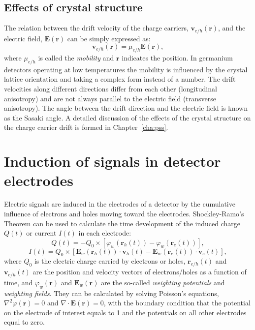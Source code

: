 \subsection{Effects of crystal structure}
\label{sec:det:struc}
The relation between the drift velocity of the charge carriers,
$\mathbf{v}_{e/h}(\mathbf{r})$, and the electric field,
$\mathbf{E}(\mathbf{r})$ can be simply expressed as:
\begin{equation} 
\label{eq:det:dv}
\mathbf{v}_{e/h} (\mathbf{r})= \mu_{e/h} \mathbf{E}(\mathbf{r}),
\end{equation}
where $\mu_{e/h}$ is called the \emph{mobility} and $\mathbf{r}$
indicates the position. In germanium detectors operating at low
temperatures the mobility is influenced by the crystal lattice
orientation and taking a complex form instead of a number. The drift
velocities along different directions differ from each other
(longitudinal anisotropy) and are not always parallel to the electric
field (transverse anisotropy). The angle between the drift direction
and the electric field is known as the Sasaki angle\cite{Sas56}. A
detailed discussion of the effects of the crystal structure on the
charge carrier drift is formed in Chapter~\ref{cha:pss}.

\section{Induction of signals in detector electrodes}
\label{sec:det:ramo}
Electric signals are induced in the electrodes of a detector by the
cumulative influence of electrons and holes moving toward the
electrodes. Shockley-Ramo's Theorem \cite{Gat82, Rad88, He00} can be
used to calculate the time development of the induced charge $Q(t)$ or
current $I(t)$ in each electrode:
\begin{equation} 
\label{eq:det:ramoq}
Q(t) = -Q_{0} \times [\varphi_{w}(\mathbf{r}_{h}(t)) -
\varphi_{w}(\mathbf{r}_{e}(t))],
\end{equation}
\begin{equation} 
\label{eq:det:ramoi}
I(t) = Q_{0} \times [\mathbf{E}_{w}(\mathbf{r}_{h}(t)) \cdot 
\mathbf{v}_{h}(t) - \mathbf{E}_{w}(\mathbf{r}_{e}(t)) \cdot 
\mathbf{v}_{e}(t)],
\end{equation}
where $Q_{0}$ is the electric charge carried by electrons or holes,
$\mathbf{r}_{e/h}(t)$ and $\mathbf{v}_{e/h}(t)$ are the position and
velocity vectors of electrons/holes as a function of time, and
$\varphi_{w}(\mathbf{r})$ and $\mathbf{E}_{w}(\mathbf{r})$ are the
so-called \emph{weighting potentials} and \emph{weighting
fields}. They can be calculated by solving Poisson's equations,
$\nabla^{2} \varphi(\mathbf{r}) = 0$ and $\nabla \cdot
\mathbf{E}(\mathbf{r}) = 0$, with the boundary condition that the
potential on the electrode of interest equals to 1 and the potentials
on all other electrodes equal to zero.

